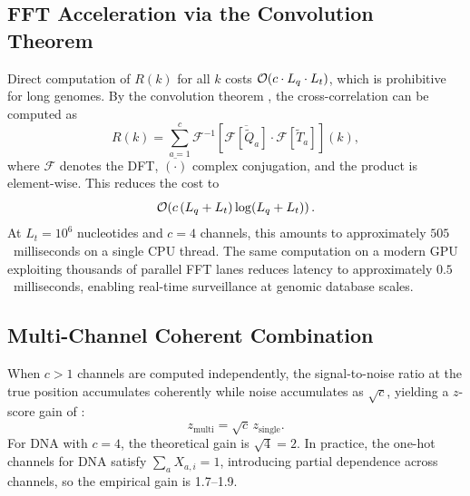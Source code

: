 \subsection{FFT Acceleration via the Convolution Theorem}

Direct computation of $R(k)$ for all $k$ costs $\mathcal{O}(c \cdot L_q \cdot L_t)$,
which is prohibitive for long genomes. By the convolution theorem
\citep{oppenheim2009}, the cross-correlation can be computed as
\begin{equation}
  R(k) = \sum_{a=1}^{c}
    \mathcal{F}^{-1}\!\left[\overline{\mathcal{F}[\widetilde{Q}_a]}\cdot \mathcal{F}[\widetilde{T}_a]\right](k),
  \label{ps:eq:fft_xcorr}
\end{equation}
where $\mathcal{F}$ denotes the DFT, $\overline{(\cdot)}$ complex conjugation,
and the product is element-wise. This reduces the cost to
\begin{equation}
  \mathcal{O}\!\left(c\,(L_q + L_t)\log(L_q + L_t)\right).
\end{equation}
At $L_t = 10^6$ nucleotides and $c = 4$ channels, this amounts to approximately
$505$~milliseconds on a single CPU thread. The same computation on a modern GPU
exploiting thousands of parallel FFT lanes \citep{moreland2003,
govindaraju2008} reduces latency to approximately $0.5$~milliseconds, enabling
real-time surveillance at genomic database scales.

\subsection{Multi-Channel Coherent Combination}

When $c > 1$ channels are computed independently, the signal-to-noise ratio at
the true position accumulates coherently while noise accumulates as
$\sqrt{c}$, yielding a $z$-score gain of \citep{vantrees2001}:
\begin{equation}
  z_{\text{multi}} = \sqrt{c}\, z_{\text{single}}.
  \label{ps:eq:zchan}
\end{equation}
For DNA with $c = 4$, the theoretical gain is $\sqrt{4} = 2$. In practice, the
one-hot channels for DNA satisfy $\sum_a X_{a,i} = 1$, introducing partial
dependence across channels, so the empirical gain is 1.7--1.9.

